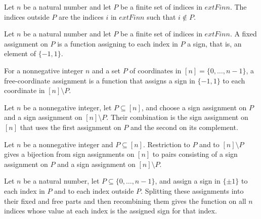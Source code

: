 \begin{definition}
\label{FABL.JuntaFreeIndex}
\leanok
Let $n$ be a natural number and let $P$ be a finite set of indices in $	ext{Fin }n$. The
indices outside $P$ are the indices $i$ in $	ext{Fin }n$ such that $i\notin P$.
\end{definition}

\begin{definition}
\label{FABL.JuntaFixedAssignment}
\leanok
{}
Let $n$ be a natural number and let $P$ be a finite set of indices in $	ext{Fin }n$. A
fixed assignment on $P$ is a function assigning to each index in $P$ a sign, that is, an
element of $\{ -1,1 \}$.
\end{definition}

\begin{definition}
\label{FABL.JuntaFreeAssignment}
\leanok
{}
For a nonnegative integer $n$ and a set $P$ of coordinates in $[n]=\{0,\ldots,n-1\}$, a
free-coordinate assignment is a function that assigns a sign in $\{-1,1\}$ to each
coordinate in $[n]\setminus P$.
\end{definition}

\begin{definition}
\label{FABL.combineJuntaAssignment}
\leanok
{}
Let $n$ be a nonnegative integer, let $P\subseteq[n]$, and choose a sign assignment on
$P$ and a sign assignment on $[n]\setminus P$. Their combination is the sign assignment
on $[n]$ that uses the first assignment on $P$ and the second on its complement.
\end{definition}

\begin{definition}
\label{FABL.juntaAssignmentSplitEquiv}
\leanok
{}
Let $n$ be a nonnegative integer and $P\subseteq[n]$. Restriction to $P$ and to
$[n]\setminus P$ gives a bijection from sign assignments on $[n]$ to pairs consisting of
a sign assignment on $P$ and a sign assignment on $[n]\setminus P$.
\end{definition}

\begin{theorem}
\label{FABL.juntaAssignmentSplitEquiv_symm_apply}
\leanok
{}
Let $n$ be a natural number, let $P\subseteq\{0,\ldots,n-1\}$, and assign a sign in
$\{\pm1\}$ to each index in $P$ and to each index outside $P$. Splitting these
assignments into their fixed and free parts and then recombining them gives the function
on all $n$ indices whose value at each index is the assigned sign for that index.
\end{theorem}

